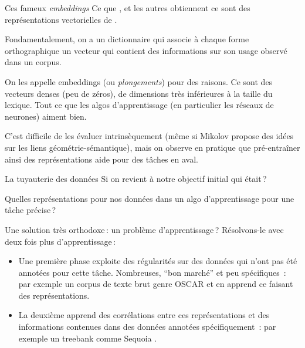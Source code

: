 \documentclass[
	xcolor={svgnames},
	aspectratio=169,
	french,
]{beamer}
\begin{document}
\begin{frame}{Ces fameux \emph{embeddings}}
	Ce que \textcite{bengio2006NeuralProbabilisticLanguage}, \textcite{mikolov2013EfficientEstimationWord} et les autres obtiennent ce sont des \alert{représentations vectorielles} de \alt<+>{mots}{\strikeThrough{mots} formes orthographiques}.

	\pause

	Fondamentalement, on a un \alert{dictionnaire} qui associe à chaque forme orthographique un vecteur qui contient des  informations sur son usage observé dans un corpus.

	\pause

	On les appelle \alert{embeddings} (ou \emph{plongements}) pour des raisons. Ce sont des vecteurs denses (peu de zéros), de dimensions très inférieures à la taille du lexique. Tout ce que les algos d'apprentissage (en particulier les réseaux de neurones) aiment bien.

	\pause

	C'est difficile de les évaluer intrinsèquement (même si Mikolov propose des idées sur les liens géométrie-sémantique), mais on observe en pratique que \alert{pré-entraîner} ainsi des représentations aide pour des tâches en aval.
\end{frame}

\begin{frame}{La tuyauterie des données}
	Si on revient à notre objectif initial \pause qui était ?

	\pause

	Quelles représentations pour nos données dans un algo d'apprentissage pour une \alert{tâche} précise ?

	\pause

	Une solution très orthodoxe : un problème d'apprentissage ? \pause Résolvons-le avec deux fois plus d'apprentissage :
	
	\pause

	\begin{itemize}[<+->]
		\item Une première phase exploite des \alert{régularités} sur des données qui n'ont pas été annotées pour cette tâche. Nombreuses, \enquote{bon marché} et peu spécifiques \pause : par exemple un corpus de texte brut genre OSCAR \parencite{ortizsuarez2019AsynchronousPipelineProcessing} et en apprend ce faisant des représentations.
		\item La deuxième apprend des corrélations entre \alert{ces} représentations et des informations contenues dans des données \alert{annotées spécifiquement} \pause : par exemple un treebank comme Sequoia \parencite{candito2012CorpusSequoiaAnnotation}.
	\end{itemize}
\end{frame}
\end{document}
